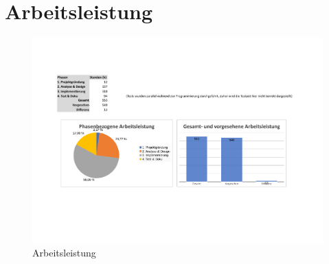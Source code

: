 \chapter{Arbeitsleistung}

\begin{figure}[!htbp]
  \centering
     \includegraphics[keepaspectratio=true,
     scale=0.65,angle={90}]{Graphics/Arbeitsleistung.pdf}
  \caption{Arbeitsleistung}
  \label{fig:Leistung}
\end{figure}
